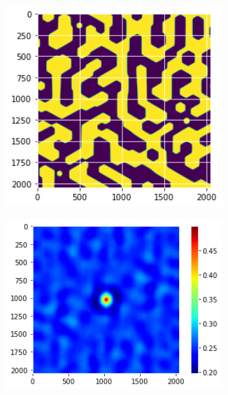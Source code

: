 \documentclass[12pt, a4paper]{report}
\begin{document}
\begin{figure}[H]
\centering
\begin{subfigure}{.32\textwidth}
  \centering
  \includegraphics[width=0.9\textwidth]{Pictures/MSFeatures/CorrHexaImage.png}
  \label{img:microstrImg}
\end{subfigure}
\begin{subfigure}{.32\textwidth}
  \centering
  \includegraphics[width=0.9\textwidth]{Pictures/MSFeatures/CorrHexaAuto.png}
  \label{img:microstrImg}
\end{subfigure}
\begin{subfigure}{.32\textwidth}
  \centering

\end{subfigure}
\end{figure}
\end{document}
